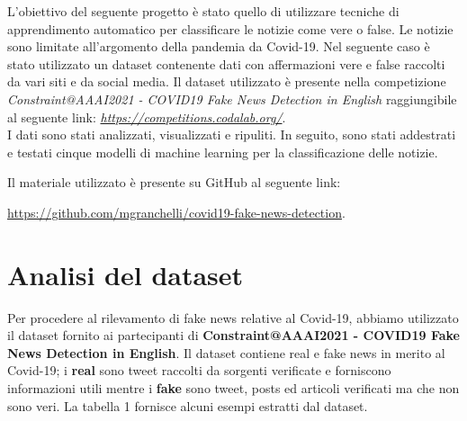 \documentclass{article}
\begin{document}
\noindent
L'obiettivo del seguente progetto è stato quello di utilizzare tecniche di apprendimento automatico per classificare le notizie come vere o false. Le notizie sono limitate all'argomento della pandemia da Covid-19. Nel seguente caso è stato utilizzato un dataset contenente dati con affermazioni vere e false raccolti da vari siti e da social media. Il dataset utilizzato è presente nella competizione \textit{Constraint@AAAI2021 - COVID19 Fake News Detection in English} raggiungibile al seguente link: \href{https://competitions.codalab.org/competitions/26655} {\textit{https://competitions.codalab.org/}}. \\
I dati sono stati analizzati, visualizzati e ripuliti. In seguito, sono stati addestrati e testati cinque modelli di machine learning per la classificazione delle notizie.

\noindent
Il materiale utilizzato è presente su GitHub al seguente link: 

\noindent
\href{https://github.com/mgranchelli/covid19-fake-news-detection} {https://github.com/mgranchelli/covid19-fake-news-detection}.




\thispagestyle{empty}
\newpage

\tableofcontents

\thispagestyle{empty}

\clearpage
{}

\section{Analisi del dataset}
Per procedere al rilevamento di fake news relative al Covid-19, abbiamo utilizzato il dataset fornito ai partecipanti di \textbf{Constraint@AAAI2021 - COVID19 Fake News Detection in English}.
Il dataset contiene real e fake news in merito al Covid-19; i \textbf{real} sono tweet raccolti da sorgenti verificate e forniscono informazioni utili mentre i \textbf{fake} sono tweet, posts ed articoli verificati ma che non sono veri. La tabella 1 fornisce alcuni esempi estratti dal dataset.
\end{document}
